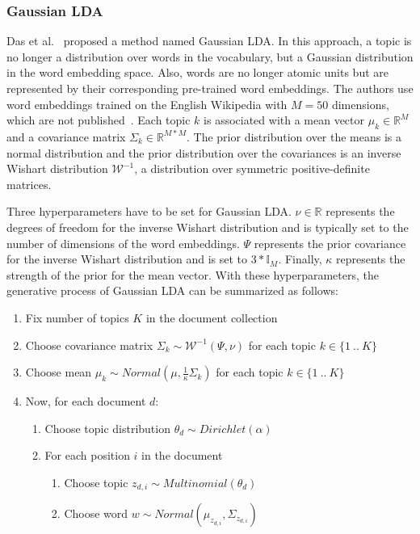 \documentclass[
        a4paper,
        titlepage,
        twoside,
        parskip,
        numbers=noenddot
        ]{scrbook}
\theoremstyle{break}
\begin{document}
\subsubsection{Gaussian LDA}
Das et al.~\cite{Das2015} proposed a method named Gaussian LDA.
In this approach, a topic is no longer a distribution over words in the vocabulary, but a Gaussian distribution in the word embedding space.
Also, words are no longer atomic units but are represented by their corresponding pre-trained word embeddings.
The authors use word embeddings trained on the English Wikipedia with $M=50$ dimensions, which are not published~\cite{Das2016}.
Each topic $k$ is associated with a mean vector $\mu_k \in \mathbb{R}^{M}$ and a  covariance matrix $\Sigma_k \in \mathbb{R}^{M * M}$.
The prior distribution over the means is a normal distribution and the prior distribution over the covariances is an inverse Wishart distribution $\mathcal{W}^{-1}$, a distribution over symmetric positive-definite matrices.

Three hyperparameters have to be set for Gaussian LDA.
$\nu \in \mathbb{R}$ represents the degrees of freedom for the inverse Wishart distribution and is typically set to the number of dimensions of the word embeddings.
$\Psi$ represents the prior covariance for the inverse Wishart distribution and is set to $3 * \mathbb{I}_M$.
Finally, $\kappa$ represents the strength of the prior for the mean vector.
With these hyperparameters, the generative process of Gaussian LDA can be summarized as follows:
\begin{enumerate}
       \item Fix number of topics $K$ in the document collection
       \item Choose covariance matrix $\Sigma_k \sim \mathcal{W}^{-1}(\Psi, \nu)$ for each topic $k \in \{1~..~K\}$
       \item Choose mean $\mu_k \sim Normal(\mu, \frac{1}{\kappa} \Sigma_k)$ for each topic $k \in \{1~..~K\}$
       \item Now, for each document $d$:
       \begin{enumerate}
              \item Choose topic distribution $\theta_d \sim Dirichlet(\alpha)$
              \item For each position $i$ in the document
              \begin{enumerate}
                     \item Choose topic $z_{d,i} \sim Multinomial(\theta_d)$
                     \item Choose word $w \sim Normal(\mu_{z_{d,i}}, \Sigma_{z_{d,i}})$
              \end{enumerate}
       \end{enumerate}
\end{enumerate}
\end{document}
